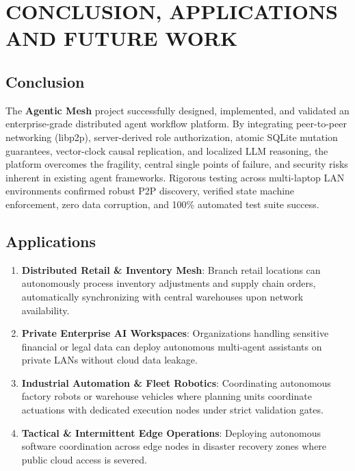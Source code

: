 \documentclass[12pt,a4paper]{report}
\begin{document}
\chapter{CONCLUSION, APPLICATIONS AND FUTURE WORK}

\section{Conclusion}
The \textbf{Agentic Mesh} project successfully designed, implemented, and validated an enterprise-grade distributed agent workflow platform. By integrating peer-to-peer networking (libp2p), server-derived role authorization, atomic SQLite mutation guarantees, vector-clock causal replication, and localized LLM reasoning, the platform overcomes the fragility, central single points of failure, and security risks inherent in existing agent frameworks. Rigorous testing across multi-laptop LAN environments confirmed robust P2P discovery, verified state machine enforcement, zero data corruption, and 100\% automated test suite success.

\section{Applications}
\begin{enumerate}[label=\roman*.,leftmargin=*,itemsep=3pt]
    \item \textbf{Distributed Retail \& Inventory Mesh}: Branch retail locations can autonomously process inventory adjustments and supply chain orders, automatically synchronizing with central warehouses upon network availability.
    \item \textbf{Private Enterprise AI Workspaces}: Organizations handling sensitive financial or legal data can deploy autonomous multi-agent assistants on private LANs without cloud data leakage.
    \item \textbf{Industrial Automation \& Fleet Robotics}: Coordinating autonomous factory robots or warehouse vehicles where planning units coordinate actuations with dedicated execution nodes under strict validation gates.
    \item \textbf{Tactical \& Intermittent Edge Operations}: Deploying autonomous software coordination across edge nodes in disaster recovery zones where public cloud access is severed.
\end{enumerate}
\end{document}
